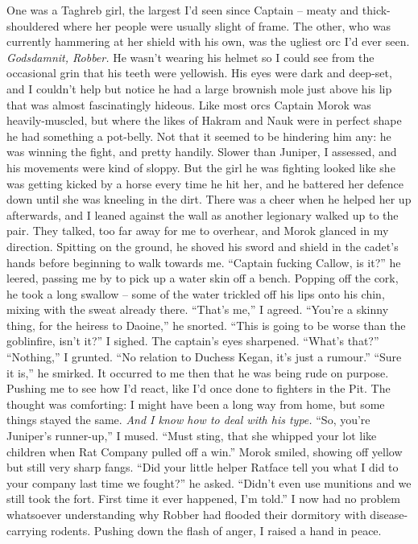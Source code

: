 \documentclass[12pt, openany]{book}
\begin{document}
One was a Taghreb girl, the largest I’d seen since Captain – meaty and thick-shouldered where her people were usually slight of frame. The other, who was currently hammering at her shield with his own, was the ugliest orc I’d ever seen. \textit{Godsdamnit, Robber.} He wasn’t wearing his helmet so I could see from the occasional grin that his teeth were yellowish. His eyes were dark and deep-set, and I couldn’t help but notice he had a large brownish mole just above his lip that was almost fascinatingly hideous. Like most orcs Captain Morok was heavily-muscled, but where the likes of Hakram and Nauk were in perfect shape he had something a pot-belly.
Not that it seemed to be hindering him any: he was winning the fight, and pretty handily. Slower than Juniper, I assessed, and his movements were kind of sloppy. But the girl he was fighting looked like she was getting kicked by a horse every time he hit her, and he battered her defence down until she was kneeling in the dirt. There was a cheer when he helped her up afterwards, and I leaned against the wall as another legionary walked up to the pair. They talked, too far away for me to overhear, and Morok glanced in my direction. Spitting on the ground, he shoved his sword and shield in the cadet’s hands before beginning to walk towards me.
“Captain fucking Callow, is it?” he leered, passing me by to pick up a water skin off a bench.
Popping off the cork, he took a long swallow – some of the water trickled off his lips onto his chin, mixing with the sweat already there.
“That’s me,” I agreed.
“You’re a skinny thing, for the heiress to Daoine,” he snorted.
“This is going to be worse than the goblinfire, isn’t it?” I sighed.
The captain’s eyes sharpened. “What’s that?”
“Nothing,” I grunted. “No relation to Duchess Kegan, it’s just a rumour.”
“Sure it is,” he smirked.
It occurred to me then that he was being rude on purpose. Pushing me to see how I’d react, like I’d once done to fighters in the Pit. The thought was comforting: I might have been a long way from home, but some things stayed the same. \textit{And I know how to deal with his type.}
“So, you’re Juniper’s runner-up,” I mused. “Must sting, that she whipped your lot like children when Rat Company pulled off a win.”
Morok smiled, showing off yellow but still very sharp fangs.
“Did your little helper Ratface tell you what I did to your company last time we fought?” he asked. “Didn’t even use munitions and we still took the fort. First time it ever happened, I’m told.”
I now had no problem whatsoever understanding why Robber had flooded their dormitory with disease-carrying rodents. Pushing down the flash of anger, I raised a hand in peace.
\end{document}
